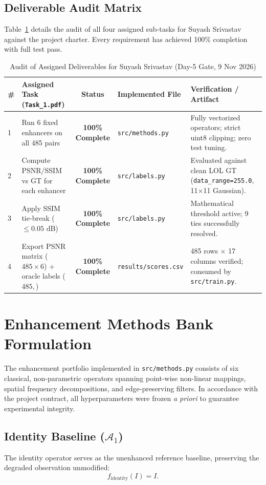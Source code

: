 \documentclass[journal]{IEEEtran}
\begin{document}
\subsection{Deliverable Audit Matrix}
Table~\ref{tab:audit} details the audit of all four assigned sub-tasks for Suyash Srivastav against the project charter. Every requirement has achieved 100\% completion with full test pass.

\begin{table}[!t]
\centering
\caption{Audit of Assigned Deliverables for Suyash Srivastav (Day-5 Gate, 9 Nov 2026)}
\label{tab:audit}
\begin{tabular}{lp{6.2cm}clp{5.0cm}}
\toprule
\textbf{\#} & \textbf{Assigned Task (\texttt{Task\_1.pdf})} & \textbf{Status} & \textbf{Implemented File} & \textbf{Verification / Artifact} \\
\midrule
1 & Run 6 fixed enhancers on all 485 pairs & \textbf{100\% Complete} & \texttt{src/methods.py} & Fully vectorized operators; strict uint8 clipping; zero test tuning. \\
2 & Compute PSNR/SSIM vs GT for each enhancer & \textbf{100\% Complete} & \texttt{src/labels.py} & Evaluated against clean LOL GT (\texttt{data\_range=255.0}, 11$\times$11 Gaussian). \\
3 & Apply SSIM tie-break ($\le 0.05\text{ dB}$) & \textbf{100\% Complete} & \texttt{src/labels.py} & Mathematical threshold active; 9 ties successfully resolved. \\
4 & Export PSNR matrix ($485 \times 6$) + oracle labels ($485,$) & \textbf{100\% Complete} & \texttt{results/scores.csv} & 485 rows $\times$ 17 columns verified; consumed by \texttt{src/train.py}. \\
\bottomrule
\end{tabular}
\end{table}

\section{Enhancement Methods Bank Formulation}
The enhancement portfolio implemented in \texttt{src/methods.py} consists of six classical, non-parametric operators spanning point-wise non-linear mappings, spatial frequency decompositions, and edge-preserving filters. In accordance with the project contract, all hyperparameters were frozen \textit{a priori} to guarantee experimental integrity.

\subsection{Identity Baseline ($\mathcal{A}_1$)}
The identity operator serves as the unenhanced reference baseline, preserving the degraded observation unmodified:
\begin{equation}
f_{\text{identity}}(I) = I.
\end{equation}
\end{document}
